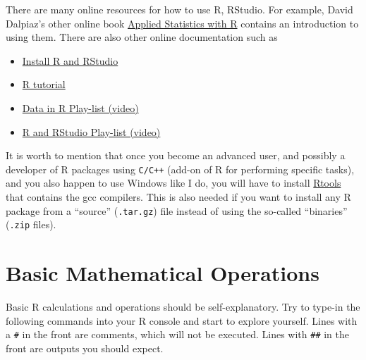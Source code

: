 \documentclass[
]{book}
\providecommand{\tightlist}{%
  \setlength{\itemsep}{0pt}\setlength{\parskip}{0pt}}
\theoremstyle{definition}
\theoremstyle{definition}
\theoremstyle{definition}
\theoremstyle{definition}
\theoremstyle{remark}
\begin{document}
There are many online resources for how to use R, RStudio. For example, David Dalpiaz's other online book \href{http://daviddalpiaz.github.io/appliedstats/}{Applied Statistics with R} contains an introduction to using them. There are also other online documentation such as

\begin{itemize}
\tightlist
\item
  \href{https://www.youtube.com/watch?v=cX532N_XLIs\&t=19s/}{Install R and RStudio}
\item
  \href{http://www.r-tutor.com/r-introduction}{R tutorial}
\item
  \href{https://www.youtube.com/playlist?list=PLBgxzZMu3GpPojVSoriMTWQCUno_3hjNi}{Data in R Play-list (video)}
\item
  \href{https://www.youtube.com/playlist?list=PLBgxzZMu3GpMjYhX7jLm5B9gEV7AOOJ5w}{R and RStudio Play-list (video)}
\end{itemize}

It is worth to mention that once you become an advanced user, and possibly a developer of R packages using \texttt{C/C++} (add-on of R for performing specific tasks), and you also happen to use Windows like I do, you will have to install \href{https://cran.r-project.org/bin/windows/Rtools/}{Rtools} that contains the gcc compilers. This is also needed if you want to install any R package from a ``source'' (\texttt{.tar.gz}) file instead of using the so-called ``binaries'' (\texttt{.zip} files).

\hypertarget{basic-mathematical-operations}{%
\section{Basic Mathematical Operations}\label{basic-mathematical-operations}}

Basic R calculations and operations should be self-explanatory. Try to type-in the following commands into your R console and start to explore yourself. Lines with a \texttt{\#} in the front are comments, which will not be executed. Lines with \texttt{\#\#} in the front are outputs you should expect.
\end{document}
